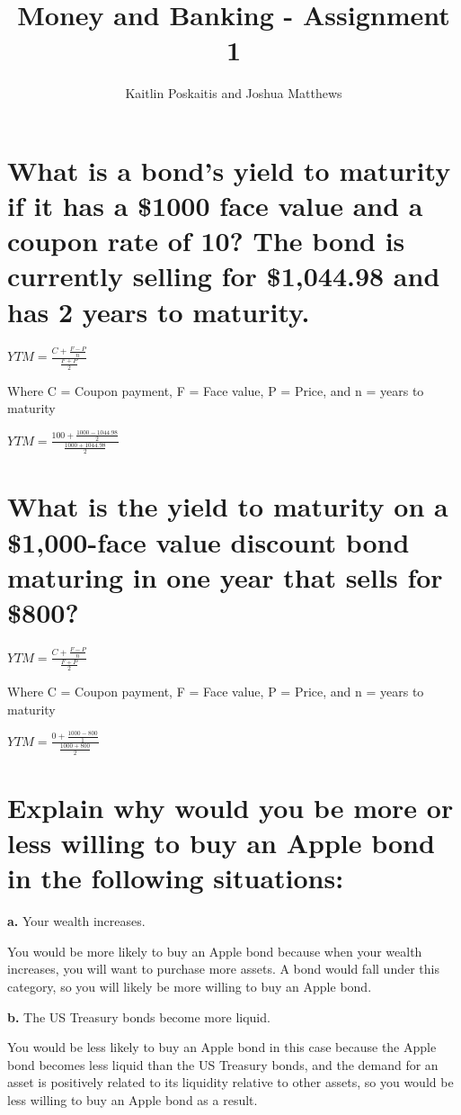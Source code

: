 \documentclass[12pt]{article}
\title{\bf Money and Banking - Assignment 1}
\author{Kaitlin Poskaitis and Joshua Matthews}
\date{}
\begin{document}
\maketitle

\section{What is a bond's yield to maturity if it has a \$1000 face value and a
coupon rate of 10? The bond is currently selling for \$1,044.98 and has 2 years
to maturity.}

\indent $YTM = \frac{C + \frac{F - P}{n}}{\frac{F + P}{2}}$

Where C = Coupon payment, F = Face value, P = Price, and n = years to maturity

\indent $YTM = \frac{100 + \frac{1000 - 1044.98}{2}}{\frac{1000 + 1044.98}{2}}$

\section{What is the yield to maturity on a \$1,000-face value discount bond
maturing in one year that sells for \$800?}

\indent $YTM = \frac{C + \frac{F - P}{n}}{\frac{F + P}{2}}$

Where C = Coupon payment, F = Face value, P = Price, and n = years to maturity

\indent $YTM = \frac{0 + \frac{1000 - 800}{1}}{\frac{1000 + 800}{2}}$

\section{Explain why would you be more or less willing to buy an Apple bond in
the following situations:}

{\bf a.} Your wealth increases.

You would be more likely to buy an Apple bond because when your wealth 
increases, you will want to purchase more assets. A bond would fall under this 
category, so you will likely be more willing to buy an Apple bond.

{\bf b.} The US Treasury bonds become more liquid.

You would be less likely to buy an Apple bond in this case because the Apple
bond becomes less liquid than the US Treasury bonds, and the demand for an 
asset is positively related to its liquidity relative to other assets, so
you would be less willing to buy an Apple bond as a result.
\end{document}

